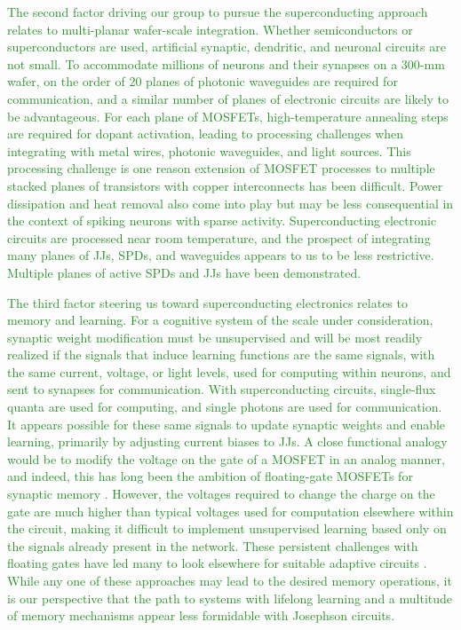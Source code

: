\documentclass[twocolumn]{article}
\begin{document}
\textcolor{ForestGreen}{The second factor driving our group to pursue the superconducting approach relates to multi-planar wafer-scale integration. Whether semiconductors or superconductors are used, artificial synaptic, dendritic, and neuronal circuits are not small. To accommodate millions of neurons and their synapses on a 300-mm wafer, on the order of 20 planes of photonic waveguides are required for communication, and a similar number of planes of electronic circuits are likely to be advantageous. For each plane of MOSFETs, high-temperature annealing steps are required for dopant activation, leading to processing challenges when integrating with metal wires, photonic waveguides, and light sources. This processing challenge is one reason extension of MOSFET processes to multiple stacked planes of transistors with copper interconnects has been difficult. Power dissipation and heat removal also come into play but may be less consequential in the context of spiking neurons with sparse activity. Superconducting electronic circuits are processed near room temperature, and the prospect of integrating many planes of JJs, SPDs, and waveguides appears to us to be less restrictive. Multiple planes of active SPDs\cite{vema2012} and JJs \cite{tobo2019} have been demonstrated.}

\textcolor{ForestGreen}{The third factor steering us toward superconducting electronics relates to memory and learning. For a cognitive system of the scale under consideration, synaptic weight modification must be unsupervised and will be most readily realized if the signals that induce learning functions are the same signals, with the same current, voltage, or light levels, used for computing within neurons, and sent to synapses for communication. With superconducting circuits, single-flux quanta are used for computing, and single photons are used for communication. It appears possible for these same signals to update synaptic weights and enable learning, primarily by adjusting current biases to JJs. A close functional analogy would be to modify the voltage on the gate of a MOSFET in an analog manner, and indeed, this has long been the ambition of floating-gate MOSFETs for synaptic memory \cite{hama2013}. However, the voltages required to change the charge on the gate are much higher than typical voltages used for computation elsewhere within the circuit, making it difficult to implement unsupervised learning based only on the signals already present in the network. These persistent challenges with floating gates have led many to look elsewhere for suitable adaptive circuits \cite{upji2019}. While any one of these approaches may lead to the desired memory operations, it is our perspective that the path to systems with lifelong learning and a multitude of memory mechanisms appear less formidable with Josephson circuits.}
\end{document}
